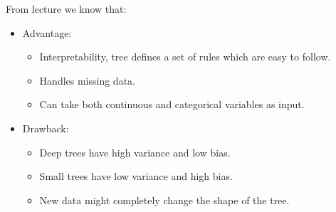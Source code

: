 From lecture \cite[p.~3]{lecture9} we know that:

\begin{itemize}
  \item Advantage:
  \begin{itemize}
    \item Interpretability, tree defines a set of rules which are easy to follow.
    \item Handles missing data.
    \item Can take both continuous and categorical variables as input.
  \end{itemize}
  \item Drawback:
  \begin{itemize}
    \item Deep trees have high variance and low bias.
    \item Small trees have low variance and high bias.
    \item New data might completely change the shape of the tree.
  \end{itemize}
\end{itemize}
